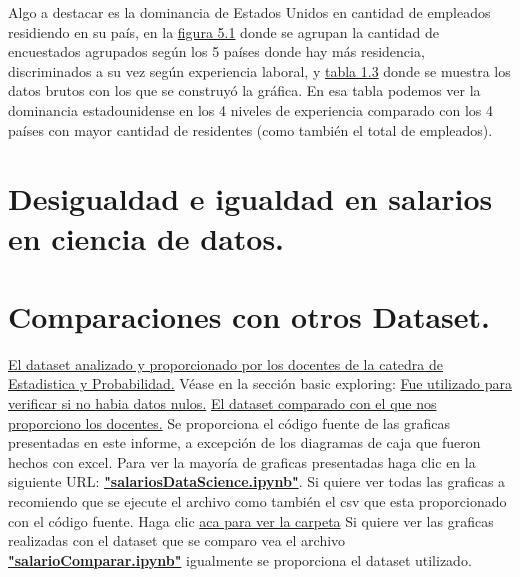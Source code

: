 \documentclass{article}
\begin{document}
Algo a destacar es la dominancia de Estados Unidos en cantidad de empleados residiendo en su país, en la \hyperref[figura 5.1 grafico de barras agrupado]{figura 5.1} donde se agrupan la cantidad de encuestados agrupados según los 5 países donde hay más residencia, discriminados a su vez según experiencia laboral, y \hyperref[tabla 1.3]{tabla 1.3} donde se muestra los datos brutos con los que se construyó la gráfica. En esa tabla podemos ver la dominancia estadounidense en los 4 niveles de experiencia comparado con los 4 países con mayor cantidad de residentes (como también el total de empleados).
	\section{Desigualdad e igualdad en salarios en ciencia de datos.}
	\section{Comparaciones con otros Dataset.}
	\begin{thebibliography}{0}
		
		 \href{https://www.kaggle.com/datasets/arnabchaki/data-science-salaries-2023}{El dataset analizado y proporcionado por los docentes de la catedra de Estadistica y Probabilidad.}
		Véase en la sección basic exploring: \href{https://www.kaggle.com/code/mudassarshaheen/data-science-salaries-eda-visualization#Employment-Types-}{Fue utilizado para verificar si no habia datos nulos.}
		 \href{https://www.kaggle.com/datasets/cedricaubin/ai-ml-salaries}{El dataset comparado con el que nos proporciono los docentes.}
		Se proporciona el código fuente de las graficas presentadas en este informe, a excepción de los diagramas de caja que fueron hechos con excel. Para ver la mayoría de graficas presentadas haga clic en la siguiente URL: \textbf{\href{https://github.com/LeandroRodrigoMolina/informeEstadisticaTP3/blob/master/codigoFuenteGraficasPython/salariosDataScience.ipynb}{"salariosDataScience.ipynb"}}. Si quiere ver todas las graficas a recomiendo que se ejecute el archivo como también el csv que esta proporcionado con el código fuente. Haga clic \href{https://github.com/LeandroRodrigoMolina/informeEstadisticaTP3/tree/master/codigoFuenteGraficasPython}{aca para ver la carpeta}
		Si quiere ver las graficas realizadas con el dataset que se comparo vea el archivo \textbf{\href{https://github.com/LeandroRodrigoMolina/informeEstadisticaTP3/blob/master/codigoFuenteGraficasPython/salarioComparar.ipynb}{"salarioComparar.ipynb"}} igualmente se proporciona el dataset utilizado.
	\end{thebibliography}
\end{document}
